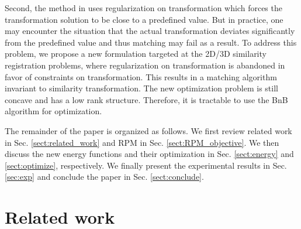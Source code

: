 \documentclass[11pt,bezier,]{article}
\begin{document}
Second,
the method in \cite{RPM_model_occlude} uses regularization on transformation  
which forces the transformation solution to be close to a predefined value.
But in practice,
one may encounter the situation that 
the actual transformation deviates significantly from the predefined value
and thus  matching may fail as a result.
To address this problem,
we propose a new formulation targeted at the 2D/3D similarity registration problems,
where regularization on transformation is abandoned in favor of constraints on transformation.
This results in a matching algorithm  invariant to similarity transformation.
The new optimization problem is still concave and has a low rank structure.
Therefore, 
it is tractable to use the BnB algorithm for optimization.


The remainder  of the paper is organized as follows. 
We first review related work in Sec. \ref{sect:related_work} and RPM  in Sec. \ref{sect:RPM_objective}. 
We then discuss the new energy functions and their optimization 
in Sec. \ref{sect:energy} and \ref{sect:optimize}, respectively. 
We finally present the experimental results in Sec. \ref{sec:exp}
and conclude the paper in Sec. \ref{sect:conclude}.






\section{Related work\label{sect:related_work}}
\end{document}
